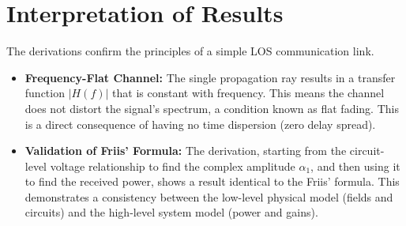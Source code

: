 \section{Interpretation of Results}
The derivations confirm the principles of a simple LOS communication link.
\begin{itemize}
	\item \textbf{Frequency-Flat Channel:} The single propagation ray results in a transfer function $|H(f)|$ that is constant with frequency. This means the channel does not distort the signal's spectrum, a condition known as flat fading. This is a direct consequence of having no time dispersion (zero delay spread).
	\item \textbf{Validation of Friis' Formula:} The derivation, starting from the circuit-level voltage relationship to find the complex amplitude $\alpha_1$, and then using it to find the received power, shows a result identical to the Friis' formula. This demonstrates a consistency between the low-level physical model (fields and circuits) and the high-level system model (power and gains).
\end{itemize}
